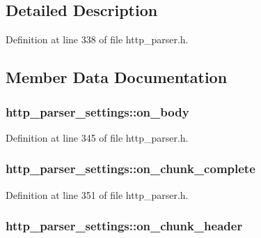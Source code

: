 \subsection{Detailed Description}


Definition at line 338 of file http\-\_\-parser.\-h.



\subsection{Member Data Documentation}
\hypertarget{structhttp__parser__settings_aaa145d7c24c91f471b2079ecb6368ae4}{
\subsubsection[{on\-\_\-body}]{ http\-\_\-parser\-\_\-settings\-::on\-\_\-body}}\label{structhttp__parser__settings_aaa145d7c24c91f471b2079ecb6368ae4}


Definition at line 345 of file http\-\_\-parser.\-h.

\hypertarget{structhttp__parser__settings_ac1c8453573094795ef41d4ba26e78846}{
\subsubsection[{on\-\_\-chunk\-\_\-complete}]{ http\-\_\-parser\-\_\-settings\-::on\-\_\-chunk\-\_\-complete}}\label{structhttp__parser__settings_ac1c8453573094795ef41d4ba26e78846}


Definition at line 351 of file http\-\_\-parser.\-h.

\hypertarget{structhttp__parser__settings_a497cf8f9d68e06e54684b71ee0f9f828}{
\subsubsection[{on\-\_\-chunk\-\_\-header}]{ http\-\_\-parser\-\_\-settings\-::on\-\_\-chunk\-\_\-header}}\label{structhttp__parser__settings_a497cf8f9d68e06e54684b71ee0f9f828}


